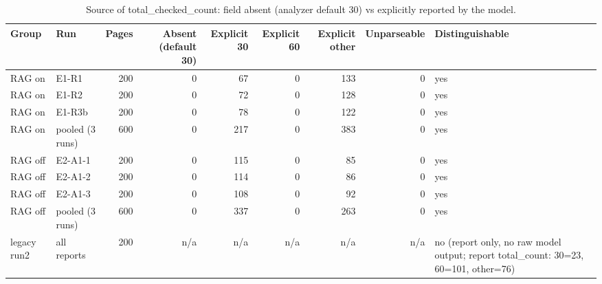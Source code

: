\begin{table}[t]
\centering
\small
\caption{Source of total\_checked\_count: field absent (analyzer default 30) vs explicitly reported by the model.}
\label{tab:e7-tcc-source}
\begin{tabular}{llrrrrrrl}
\toprule
Group & Run & Pages & Absent (default 30) & Explicit 30 & Explicit 60 & Explicit other & Unparseable & Distinguishable \\
\midrule
RAG on & E1-R1 & 200 & 0 & 67 & 0 & 133 & 0 & yes \\
RAG on & E1-R2 & 200 & 0 & 72 & 0 & 128 & 0 & yes \\
RAG on & E1-R3b & 200 & 0 & 78 & 0 & 122 & 0 & yes \\
RAG on & pooled (3 runs) & 600 & 0 & 217 & 0 & 383 & 0 & yes \\
RAG off & E2-A1-1 & 200 & 0 & 115 & 0 & 85 & 0 & yes \\
RAG off & E2-A1-2 & 200 & 0 & 114 & 0 & 86 & 0 & yes \\
RAG off & E2-A1-3 & 200 & 0 & 108 & 0 & 92 & 0 & yes \\
RAG off & pooled (3 runs) & 600 & 0 & 337 & 0 & 263 & 0 & yes \\
legacy run2 & all reports & 200 & n/a & n/a & n/a & n/a & n/a & no (report only, no raw model output; report total\_count: 30=23, 60=101, other=76) \\
\bottomrule
\end{tabular}
\end{table}

